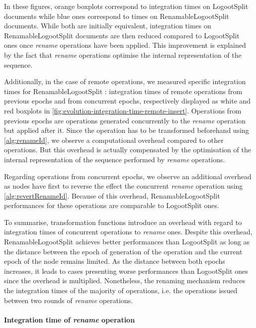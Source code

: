 \documentclass[sigplan,10pt]{acmart}
\newcommand{\ie}{i.e. }
\begin{document}
In these figures, orange boxplots correspond to integration times on LogootSplit documents while blue ones correspond to times on RenamableLogootSplit documents.
While both are initially equivalent, integration times on RenamableLogootSplit documents are then reduced compared to LogootSplit ones once \emph{rename} operations have been applied.
This improvement is explained by the fact that \emph{rename} operations optimise the internal representation of the sequence.

Additionally, in the case of remote operations, we measured specific integration times for RenamableLogootSplit : integration times of remote operations from previous epochs and from concurrent epochs, respectively displayed as white and red boxplots in \autoref{fig:evolution-integration-time-remote-insert}.
Operations from previous epochs are operations generated concurrently to the \emph{rename} operation but applied after it.
Since the operation has to be transformed beforehand using \autoref{alg:renameId}, we observe a computational overhead compared to other operations.
But this overhead is actually compensated by the optimisation of the internal representation of the sequence performed by \emph{rename} operations.

Regarding operations from concurrent epochs, we observe an additional overhead as nodes have first to reverse the effect the concurrent \emph{rename} operation using \autoref{alg:revertRenameId}.
Because of this overhead, RenamableLogootSplit performances for these operations are comparable to LogootSplit ones.

To summarise, transformation functions introduce an overhead with regard to integration times of concurrent operations to \emph{rename} ones.
Despite this overhead, RenamableLogootSplit achieves better performances than LogootSplit as long as the distance between the epoch of generation of the operation and the current epoch of the node remains limited.
As the distance between both epochs increases, it leads to cases presenting worse performances than LogootSplit ones since the overhead is multiplied.
Nonetheless, the renaming mechanism reduces the integration times of the majority of operations, \ie the operations issued between two rounds of \emph{rename} operations.

\paragraph{Integration time of \emph{rename} operation}
\end{document}
